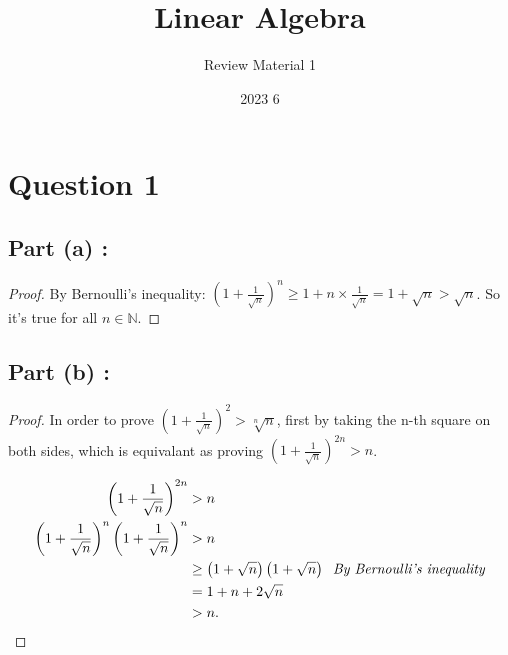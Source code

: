 \documentclass[12pt]{article}
\title{Linear Algebra}
\author{Review Material 1}
\date{2023 6}
\begin{document}
\doublespacing

\section*{Question 1}

\subsection*{Part (a) :}
\begin{proof}
By Bernoulli's inequality: $\displaystyle{\left( 
1 + \frac{1}{\sqrt{n}}\right)^n \geq 1 + n \times
\frac{1}{\sqrt{n}} = 1 + \sqrt{n} > \sqrt{n}}$.
So it's true for all $n \in \mathbb{N}$.
\end{proof}

\subsection*{Part (b) :}
\begin{proof}
In order to prove $\displaystyle{\left( 
1 + \frac{1}{\sqrt{n}} \right)^2 > \sqrt[n]{n}}$,
first by taking the n-th square on both sides, 
which is equivalant as proving 
$\displaystyle{\left( 
1 + \frac{1}{\sqrt{n}} \right)^{2n} > n}$.

\begin{align*}
    \left( 
    1 + \frac{1}{\sqrt{n}} \right)^{2n} &> n \\
    \left( 1 + \frac{1}{\sqrt{n}}
    \right)^n \left( 1 + \frac{1}{\sqrt{n}}
    \right)^n &> n \\
    & \geq \left( 1 + \sqrt{n} \right) \left( 1 + \sqrt{n} \right) 
    \hspace*{0.2cm} \textit{By Bernoulli's
    inequality}\\
    & = 1 + n + 2\sqrt{n} \\
    & > n.
\end{align*}
\end{proof}
\end{document}
